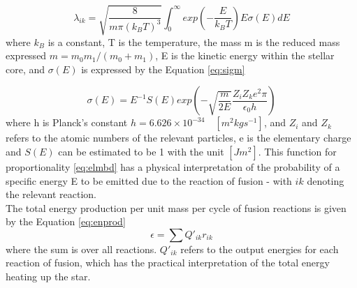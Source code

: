 \documentclass[10pt, nofootinbib, twocolumn]{revtex4-1}
\begin{document}
\begin{equation}
    \lambda_{ik}=\sqrt{\frac{8}{m\pi(k_BT)^3}}\int_0^\infty{exp(-\frac{E}{k_BT})E\sigma (E)dE} \label{eq:elmbd}
\end{equation}
where $k_B$ is a constant, T is the temperature,  the mass m is the reduced mass expressed $m=m_0m_1/(m_0+m_1)$, E is the kinetic energy within the stellar core, and $\sigma (E)$ is expressed by the Equation \eqref{eq:sigm}

\begin{equation}
    \sigma (E)=E^{-1}S(E)exp(-\sqrt{\frac{m}{2E}}\frac{Z_iZ_ke^2\pi}{\epsilon_0h}) \label{eq:sigm}
\end{equation}
where h is Planck's constant $h=6.626\times 10^{-34} \quad [m^2kgs^{-1}]$, and $Z_i$ and $Z_k$ refers to the atomic numbers of the relevant particles, e is the elementary charge and $S(E)$ can be estimated to be 1 with the unit $[Jm^2]$. This function for proportionality \eqref{eq:elmbd} has a physical interpretation of the probability of a specific energy E to be emitted due to the reaction of fusion - with $ik$ denoting the relevant reaction.  \\

The total energy production per unit mass per cycle of fusion reactions is given by the Equation \eqref{eq:enprod}
\begin{equation}
    \epsilon = \sum{Q'_{ik} r_{ik}} \label{eq:enprod}
\end{equation}
where the sum is over all reactions. $Q'_{ik}$ refers to the output energies for each reaction of fusion, which has the practical interpretation of the total energy heating up the star.



\newpage
\end{document}
